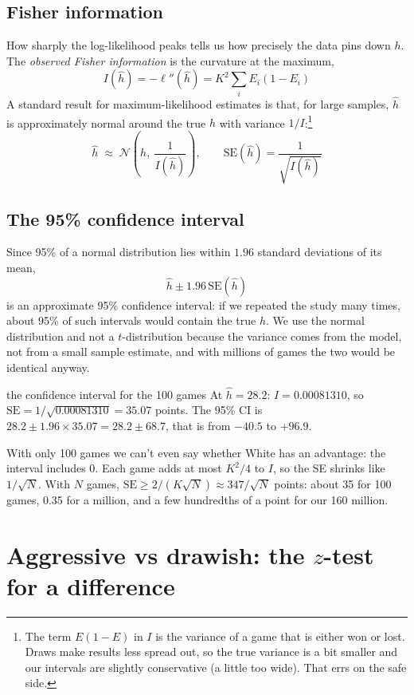 \documentclass[11pt,a4paper]{article}
\begin{document}
\subsection{Fisher information}
How sharply the log-likelihood peaks tells us how precisely the data pins down $h$. The
\emph{observed Fisher information} is the curvature at the maximum,
\[
I(\hat h) = -\ell''(\hat h) = K^2 \sum_i E_i (1 - E_i)
\]
A standard result for maximum-likelihood estimates is that, for large samples, $\hat h$ is
approximately normal around the true $h$ with variance $1/I$:\footnote{The term $E(1-E)$ in $I$ is
the variance of a game that is either won or lost. Draws make results less spread out, so the true
variance is a bit smaller and our intervals are slightly conservative (a little too wide). That
errs on the safe side.}
\[
\hat h \;\approx\; \mathcal N\!\left(h,\ \frac{1}{I(\hat h)}\right), \qquad
\mathrm{SE}(\hat h) = \frac{1}{\sqrt{I(\hat h)}}
\]

\subsection{The 95\% confidence interval}
Since 95\% of a normal distribution lies within $1.96$ standard deviations of its mean,
\[
\hat h \pm 1.96\, \mathrm{SE}(\hat h)
\]
is an approximate 95\% confidence interval: if we repeated the study many times, about 95\% of
such intervals would contain the true $h$. We use the normal distribution and not a
$t$-distribution because the variance comes from the model, not from a small sample estimate,
and with millions of games the two would be identical anyway.

\begin{example}{the confidence interval for the 100 games}
At $\hat h = 28.2$: $I = 0.00081310$, so $\mathrm{SE} = 1/\sqrt{0.00081310} = 35.07$ points.
The 95\% CI is $28.2 \pm 1.96 \times 35.07 = 28.2 \pm 68.7$, that is from $-40.5$ to $+96.9$.

With only 100 games we can't even say whether White has an advantage: the interval includes 0.
Each game adds at most $K^2/4$ to $I$, so the SE shrinks like $1/\sqrt N$. With $N$ games,
$\mathrm{SE} \ge 2/(K\sqrt N) \approx 347/\sqrt N$ points: about 35 for 100 games, 0.35 for a
million, and a few hundredths of a point for our 160 million.
\end{example}

\section{Aggressive vs drawish: the $z$-test for a difference}\label{sec:compare}
\end{document}
